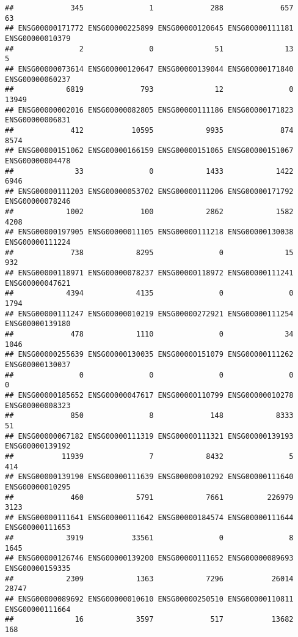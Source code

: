 \documentclass[
]{article}
\begin{document}
\begin{verbatim}
##             345               1             288             657              63 
## ENSG00000171772 ENSG00000225899 ENSG00000120645 ENSG00000111181 ENSG00000010379 
##               2               0              51              13               5 
## ENSG00000073614 ENSG00000120647 ENSG00000139044 ENSG00000171840 ENSG00000060237 
##            6819             793              12               0           13949 
## ENSG00000002016 ENSG00000082805 ENSG00000111186 ENSG00000171823 ENSG00000006831 
##             412           10595            9935             874            8574 
## ENSG00000151062 ENSG00000166159 ENSG00000151065 ENSG00000151067 ENSG00000004478 
##              33               0            1433            1422            6946 
## ENSG00000111203 ENSG00000053702 ENSG00000111206 ENSG00000171792 ENSG00000078246 
##            1002             100            2862            1582            4208 
## ENSG00000197905 ENSG00000011105 ENSG00000111218 ENSG00000130038 ENSG00000111224 
##             738            8295               0              15             932 
## ENSG00000118971 ENSG00000078237 ENSG00000118972 ENSG00000111241 ENSG00000047621 
##            4394            4135               0               0            1794 
## ENSG00000111247 ENSG00000010219 ENSG00000272921 ENSG00000111254 ENSG00000139180 
##             478            1110               0              34            1046 
## ENSG00000255639 ENSG00000130035 ENSG00000151079 ENSG00000111262 ENSG00000130037 
##               0               0               0               0               0 
## ENSG00000185652 ENSG00000047617 ENSG00000110799 ENSG00000010278 ENSG00000008323 
##             850               8             148            8333              51 
## ENSG00000067182 ENSG00000111319 ENSG00000111321 ENSG00000139193 ENSG00000139192 
##           11939               7            8432               5             414 
## ENSG00000139190 ENSG00000111639 ENSG00000010292 ENSG00000111640 ENSG00000010295 
##             460            5791            7661          226979            3123 
## ENSG00000111641 ENSG00000111642 ENSG00000184574 ENSG00000111644 ENSG00000111653 
##            3919           33561               0               8            1645 
## ENSG00000126746 ENSG00000139200 ENSG00000111652 ENSG00000089693 ENSG00000159335 
##            2309            1363            7296           26014           28747 
## ENSG00000089692 ENSG00000010610 ENSG00000250510 ENSG00000110811 ENSG00000111664 
##              16            3597             517           13682             168 

\end{verbatim}
\end{document}
